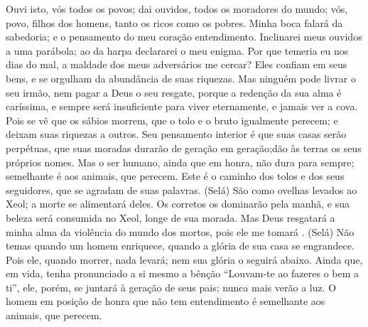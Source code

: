 {\PP 
  Ouvi isto, vós todos os povos; dai ouvidos, todos os moradores do mundo;
  vós, povo, filhos dos homens,
 tanto os ricos como os pobres.
  Minha boca falará da sabedoria; e o pensamento do meu coração
{} entendimento.
  Inclinarei meus ouvidos a uma parábola; ao
{} da harpa declararei o meu enigma.
  Por que temeria eu nos dias do mal,
{} a maldade dos meus adversários
 me cercar?
  Eles confiam em seus bens, e se orgulham da abundância de suas riquezas.
  Mas ninguém pode livrar o seu irmão, nem pagar a Deus o seu resgate,
  porque a redenção da sua alma é caríssima, e sempre será insuficiente
  para viver eternamente, e jamais ver a cova.
  Pois se vê que os sábios morrem, que o tolo e o bruto igualmente perecem; e deixam suas riquezas a outros.
  Seu pensamento interior é que suas casas serão perpétuas, que suas moradas durarão de geração em geração;dão às terras os seus próprios nomes.
  Mas o ser humano, ainda que em honra, não dura para sempre; semelhante é aos animais, que perecem.
  Este é o caminho dos tolos e dos seus seguidores, que se agradam de suas palavras. (Selá)
  São como ovelhas levados ao Xeol;
 a morte se alimentará deles. Os corretos os dominarão pela manhã, e sua beleza será consumida no Xeol, longe de sua morada.
  Mas Deus resgatará a minha alma da violência
 do mundo dos mortos, pois ele me tomará
{} . (Selá)
  Não temas quando um homem enriquece, quando a glória de sua casa se engrandece.
  Pois ele, quando morrer, nada levará; nem sua glória o seguirá abaixo.
  Ainda que, em vida, tenha pronunciado a si mesmo a bênção “Louvam-te ao fazeres o bem a ti”,
  ele, porém, se juntará à geração de seus pais; nunca mais verão a luz.
  O homem em posição de honra que não tem entendimento é semelhante aos animais, que perecem.
\par }


